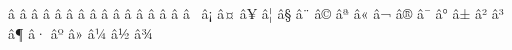 \mubyte \wr ^^e2^^89^^80\endmubyte %
\mubyte \nsim ^^e2^^89^^81\endmubyte %
\mubyte \simeq ^^e2^^89^^83\endmubyte %
\mubyte \cong ^^e2^^89^^85\endmubyte %
\mubyte \approx ^^e2^^89^^88\endmubyte %
\mubyte \asymp ^^e2^^89^^8d\endmubyte %
\mubyte \Bumpeq ^^e2^^89^^8e\endmubyte %
\mubyte \bumpeq ^^e2^^89^^8f\endmubyte %
\mubyte \doteq ^^e2^^89^^90\endmubyte %
\mubyte \doteqdot ^^e2^^89^^91\endmubyte %
\mubyte \failingdoteq ^^e2^^89^^92\endmubyte %
\mubyte \risingdoteq ^^e2^^89^^93\endmubyte %
\mubyte \eqcirc ^^e2^^89^^96\endmubyte %
\mubyte \circeq ^^e2^^89^^97\endmubyte %
\mubyte \triangleq ^^e2^^89^^9c\endmubyte %
\mubyte \neq ^^e2^^89^^a0\endmubyte %
\mubyte \equiv ^^e2^^89^^a1\endmubyte %
\mubyte \leq ^^e2^^89^^a4\endmubyte %
\mubyte \geq ^^e2^^89^^a5\endmubyte %
\mubyte \leqq ^^e2^^89^^a6\endmubyte %
\mubyte \geqq ^^e2^^89^^a7\endmubyte %
\mubyte \lneqq ^^e2^^89^^a8\endmubyte %
\mubyte \gneqq ^^e2^^89^^a9\endmubyte %
\mubyte \ll ^^e2^^89^^aa\endmubyte %
\mubyte \gg ^^e2^^89^^ab\endmubyte %
\mubyte \between ^^e2^^89^^ac\endmubyte %
\mubyte \nless ^^e2^^89^^ae\endmubyte %
\mubyte \ngtr ^^e2^^89^^af\endmubyte %
\mubyte \nleq ^^e2^^89^^b0\endmubyte %
\mubyte \ngeq ^^e2^^89^^b1\endmubyte %
\mubyte \lesssim ^^e2^^89^^b2\endmubyte %
\mubyte \gtrsim ^^e2^^89^^b3\endmubyte %
\mubyte \lessgtr ^^e2^^89^^b6\endmubyte %
\mubyte \gtrless ^^e2^^89^^b7\endmubyte %
\mubyte \prec ^^e2^^89^^ba\endmubyte %
\mubyte \succ ^^e2^^89^^bb\endmubyte %
\mubyte \preceq ^^e2^^89^^bc\endmubyte %
\mubyte \succeq ^^e2^^89^^bd\endmubyte %
\mubyte \precsim ^^e2^^89^^be\endmubyte %
